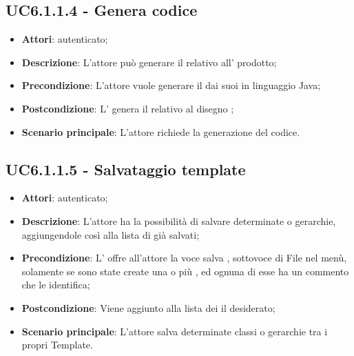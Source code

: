 \subsection{UC6.1.1.4 - Genera codice}
\label{ssec:UC6.1.1.4}
\begin{itemize}
\item \textbf{Attori}:  autenticato;
\item \textbf{Descrizione}: L’attore può generare il  relativo all’ prodotto;
\item \textbf{Precondizione}: L’attore vuole generare il  dai suoi   in linguaggio Java;
\item \textbf{Postcondizione}: L’ genera il  relativo al disegno ;
\item \textbf{Scenario principale}: L'attore richiede la generazione del codice.
\end{itemize}
\subsection{UC6.1.1.5 - Salvataggio template}
\label{ssec:UC6.1.1.5}
\begin{itemize}
\item \textbf{Attori}:  autenticato;
\item \textbf{Descrizione}: L’attore ha la possibilità di salvare determinate  o gerarchie, aggiungendole così alla lista di  già salvati;
\item \textbf{Precondizione}: L’ offre all’attore la voce salva , sottovoce di File nel menù, solamente se sono state create una o più , ed ognuna di esse ha un commento che le identifica;
\item \textbf{Postcondizione}: Viene aggiunto alla lista dei  il  desiderato;
\item \textbf{Scenario principale}: L'attore salva determinate classi o gerarchie tra i propri Template.
\end{itemize}
\newpage
